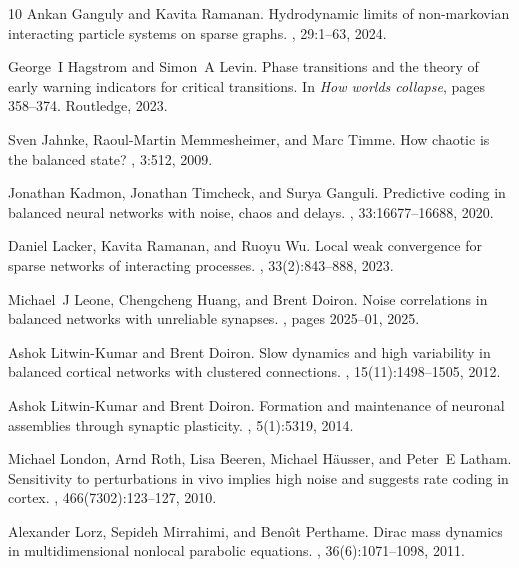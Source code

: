 \documentclass[onefignum,onetabnum]{siamart190516}
\newcommand{\1}{\mathbbm{1}}
\begin{document}
\begin{thebibliography}{10}
Ankan Ganguly and Kavita Ramanan.
\newblock Hydrodynamic limits of non-markovian interacting particle systems on
  sparse graphs.
, 29:1--63, 2024.

George~I Hagstrom and Simon~A Levin.
\newblock Phase transitions and the theory of early warning indicators for
  critical transitions.
\newblock In {\em How worlds collapse}, pages 358--374. Routledge, 2023.

Sven Jahnke, Raoul-Martin Memmesheimer, and Marc Timme.
\newblock How chaotic is the balanced state?
, 3:512, 2009.

Jonathan Kadmon, Jonathan Timcheck, and Surya Ganguli.
\newblock Predictive coding in balanced neural networks with noise, chaos and
  delays.
,
  33:16677--16688, 2020.

Daniel Lacker, Kavita Ramanan, and Ruoyu Wu.
\newblock Local weak convergence for sparse networks of interacting processes.
, 33(2):843--888, 2023.

Michael~J Leone, Chengcheng Huang, and Brent Doiron.
\newblock Noise correlations in balanced networks with unreliable synapses.
, pages 2025--01, 2025.

Ashok Litwin-Kumar and Brent Doiron.
\newblock Slow dynamics and high variability in balanced cortical networks with
  clustered connections.
, 15(11):1498--1505, 2012.

Ashok Litwin-Kumar and Brent Doiron.
\newblock Formation and maintenance of neuronal assemblies through synaptic
  plasticity.
, 5(1):5319, 2014.

Michael London, Arnd Roth, Lisa Beeren, Michael H{\"a}usser, and Peter~E
  Latham.
\newblock Sensitivity to perturbations in vivo implies high noise and suggests
  rate coding in cortex.
, 466(7302):123--127, 2010.

Alexander Lorz, Sepideh Mirrahimi, and Beno{\^\i}t Perthame.
\newblock Dirac mass dynamics in multidimensional nonlocal parabolic equations.
,
  36(6):1071--1098, 2011.


\end{thebibliography}
\end{document}
